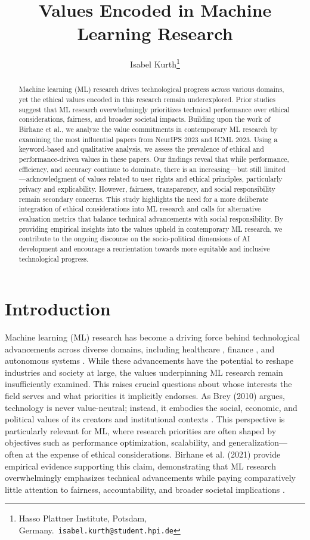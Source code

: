 \documentclass{article}
\title{Values Encoded in Machine Learning Research}
\author{Isabel Kurth\thanks{Hasso Plattner Institute, Potsdam, Germany.\ \texttt{isabel.kurth@student.hpi.de}}}
\begin{document}
\maketitle
\thispagestyle{plain}

\begin{abstract}
Machine learning (ML) research drives technological progress across various domains, yet the ethical values encoded in this research remain underexplored. Prior studies suggest that ML research overwhelmingly prioritizes 
technical performance over ethical considerations, fairness, and broader societal impacts. Building upon the work of Birhane et al.\cite{valuesInML2021}, we analyze the value commitments in contemporary ML research by examining 
the most influential papers from NeurIPS 2023 and ICML 2023. Using a keyword-based and qualitative analysis, we assess the prevalence of ethical and performance-driven values in these papers. Our findings reveal that while 
performance, efficiency, and accuracy continue to dominate, there is an increasing—but still limited—acknowledgment of values related to user rights and ethical principles, particularly privacy and explicability. However, 
fairness, transparency, and social responsibility remain secondary concerns. This study highlights the need for a more deliberate integration of ethical considerations into ML research and calls for alternative evaluation metrics 
that balance technical advancements with social responsibility. By providing empirical insights into the values upheld in contemporary ML research, we contribute to the ongoing discourse on the socio-political dimensions of 
AI development and encourage a reorientation towards more equitable and inclusive technological progress.
\end{abstract}

\section{Introduction}
Machine learning (ML) research has become a driving force behind technological advancements across diverse domains, including healthcare \cite{esteva2019guide}, finance \cite{berg2022fintech}, and autonomous systems \cite{hawkins2021guidance}. 
While these advancements have the potential to reshape industries and society at large, the values underpinning ML research remain insufficiently examined. This raises crucial questions about whose interests the field serves and what priorities it implicitly endorses.
As Brey (2010) argues, technology is never value-neutral; instead, it embodies the social, economic, and political values of its creators and institutional contexts \cite{brey2010values}. This perspective is particularly relevant for ML, 
where research priorities are often shaped by objectives such as performance optimization, scalability, and generalization—often at the expense of ethical considerations. Birhane et al. (2021) provide empirical evidence supporting this 
claim, demonstrating that ML research overwhelmingly emphasizes technical advancements while paying comparatively little attention to fairness, accountability, and broader societal implications \cite{valuesInML2021}.
\end{document}
